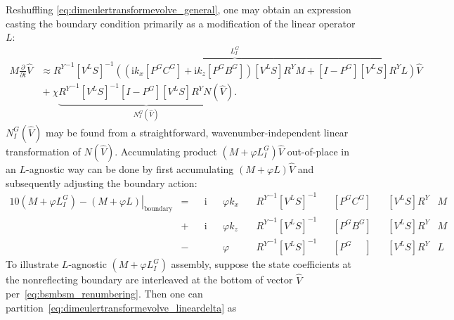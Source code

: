 \documentclass[letterpaper,11pt,nointlimits,reqno,draft]{amsbook}
\newcommand{\ii}{\ensuremath{\mathrm{i}}}
\begin{document}
Reshuffling \eqref{eq:dimeulertransformevolve_general}, one may obtain an
expression casting the boundary condition primarily as a modification of the
linear operator $L$:
\begin{align}
\label{eq:dimeulertransformevolve_linear}
  M \frac{\partial}{\partial{}t}
  \hat{V}
&\approx
\overbrace{
  {R^Y}^{-1}
  \left[V^L S\right]^{-1}
  \left(
    \left( \ii k_x \left[P^G C^G\right] + \ii k_z \left[P^G B^G\right] \right)
    \left[V^L S\right] R^Y M
    +
    \left[I-P^G\right] \left[V^L S\right] R^Y
    L
  \right)
}^{L_I^G}
  \hat{V}
\\
&{}+
  \chi
\underbrace{
  {R^Y}^{-1}
  \left[V^L S\right]^{-1}
  \left[I - P^G\right] \left[V^L S\right] R^Y
  N(\hat{V})
}_{N_I^G\left(\hat{V}\right)}
.
\end{align}
$N_I^G(\hat{V})$ may be found from a straightforward, wavenumber-independent
linear transformation of $N(\hat{V})$. Accumulating product
$\left(M+\varphi{}L_I^G\right)\hat{V}$ out-of-place in an $L$-agnostic way can
be done by first accumulating $\left(M+\varphi{}L\right)\hat{V}$ and
subsequently adjusting the boundary action:
\begin{alignat}{10}
\label{eq:dimeulertransformevolve_lineardelta}
\left.\left(M+\varphi{}L_I^G\right) - \left(M+\varphi{}L\right)\right|_\text{boundary}
  &={}   &&\ii &&\varphi{} k_x \, &&{R^Y}^{-1} \left[V^L S\right]^{-1} &&\left[P^G C^G\right] &&\left[V^L S\right] {R^Y} & M& \\
  &{}+{} &&\ii &&\varphi{} k_z    &&{R^Y}^{-1} \left[V^L S\right]^{-1} &&\left[P^G B^G\right] &&\left[V^L S\right] {R^Y} & M& \\
  &{}-{} &&    &&\varphi{}        &&{R^Y}^{-1} \left[V^L S\right]^{-1} &&\left[P^G \phantom{B^G}   \right] &&\left[V^L S\right] {R^Y} & L&
\end{alignat}
To illustrate $L$-agnostic $\left(M+\varphi{}L_I^G\right)$ assembly, suppose the
state coefficients at the nonreflecting boundary are interleaved at the bottom
of vector $\hat{V}$ per~\eqref{eq:bsmbsm_renumbering}. Then one can
partition~\eqref{eq:dimeulertransformevolve_lineardelta} as
\end{document}
